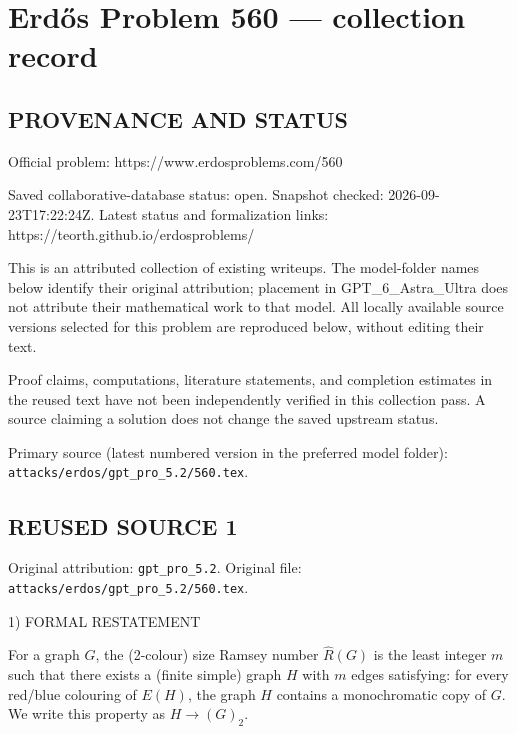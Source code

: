 \section*{Erd\H{o}s Problem 560 --- collection record}

\subsection*{PROVENANCE AND STATUS}
Official problem: https://www.erdosproblems.com/560

Saved collaborative-database status: open.
Snapshot checked: 2026-09-23T17:22:24Z.
Latest status and formalization links: https://teorth.github.io/erdosproblems/

This is an attributed collection of existing writeups. The model-folder names below identify their original attribution; placement in GPT\_6\_Astra\_Ultra does not attribute their mathematical work to that model. All locally available source versions selected for this problem are reproduced below, without editing their text.

Proof claims, computations, literature statements, and completion estimates in the reused text have not been independently verified in this collection pass. A source claiming a solution does not change the saved upstream status.

Primary source (latest numbered version in the preferred model folder): \texttt{attacks/erdos/gpt\_pro\_5.2/560.tex}.

\subsection*{REUSED SOURCE 1}
Original attribution: \texttt{gpt\_pro\_5.2}.
Original file: \texttt{attacks/erdos/gpt\_pro\_5.2/560.tex}.


1) FORMAL RESTATEMENT

For a graph $G$, the (2-colour) size Ramsey number $\hat R(G)$ is the least integer $m$ such that there exists a (finite simple) graph $H$ with $m$ edges satisfying:
for every red/blue colouring of $E(H)$, the graph $H$ contains a monochromatic copy of $G$.
We write this property as $H\to (G)_2$.

